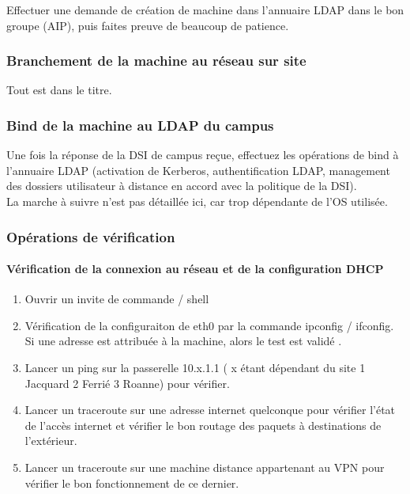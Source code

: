 \documentclass[a4paper]{article}
\begin{document}
Effectuer une demande de création de machine dans l'annuaire LDAP dans le bon groupe (AIP), puis faites preuve de beaucoup de patience.

\subsubsection{Branchement de la machine au réseau sur site}
Tout est dans le titre.

\subsubsection{Bind de la machine au LDAP du campus}

Une fois la réponse de la DSI de campus reçue, effectuez les opérations de bind à l'annuaire LDAP  (activation de Kerberos, authentification LDAP, management des dossiers utilisateur à distance en accord avec la politique de la DSI).\\
La marche à suivre n'est pas détaillée ici, car trop dépendante de l'OS utilisée.

\subsubsection{Opérations de vérification}

\paragraph{Vérification de la connexion au réseau et de la configuration DHCP}

\begin{enumerate}
\item Ouvrir un invite de commande / shell
\item Vérification de la configuraiton de eth0 par la commande ipconfig / ifconfig. Si une adresse est attribuée à la machine, alors le test est validé . 
\item Lancer un ping sur la passerelle 10.x.1.1 ( x étant dépendant du site 1 Jacquard 2 Ferrié 3 Roanne) pour vérifier. 
\item Lancer un traceroute sur une adresse internet quelconque pour vérifier l'état de l'accès internet et vérifier le bon routage des paquets à destinations de l'extérieur.
\item Lancer un traceroute sur une machine distance appartenant au VPN pour vérifier le bon fonctionnement de ce dernier.
\end{enumerate}
\end{document}
